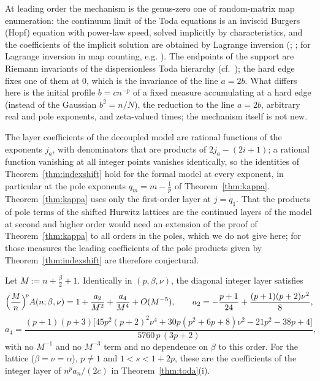 At leading order the mechanism is the genus-zero one of random-matrix map enumeration: the continuum limit of the Toda equations is an
inviscid Burgers (Hopf) equation with power-law speed, solved implicitly by characteristics, and the coefficients of the implicit
solution are obtained by Lagrange inversion (\cite[Section~2.3]{Ercolani}; \cite{EMP}; for Lagrange inversion in map counting, e.g.
\cite[Section~26.4]{Bouttier}). The endpoints of the support are Riemann invariants of the dispersionless Toda hierarchy
(cf.~\cite{KonopelchenkoMAM}); the hard edge fixes one of them at $0$, which is the invariance of the line $a=2b$. What differs here is the
initial profile $b=cn^{-p}$ of a fixed measure accumulating at a hard edge (instead of the Gaussian $b^2=n/N$), the reduction to the
line $a=2b$, arbitrary real and pole exponents, and zeta-valued times; the mechanism itself is not new.

\begin{remark}\label{rem:indexshift-poles}
The layer coefficients of the decoupled model are rational functions of the exponents $j_a$, with denominators that are products of
$2j_a-(2i+1)$; a rational function vanishing at all integer points vanishes identically, so the identities of
Theorem~\ref{thm:indexshift} hold for the formal model at every exponent, in particular at the pole exponents $q_m=m-\frac1p$ of
Theorem~\ref{thm:kappa}. Theorem~\ref{thm:kappa} uses only the first-order layer at $j=q_1$. That the products of pole terms of the
shifted Hurwitz lattices are the continued layers of the model at second and higher order would need an extension of the proof of
Theorem~\ref{thm:kappa} to all orders in the poles, which we do not give here; for those measures the leading coefficients of the pole
products given by Theorem~\ref{thm:indexshift} are therefore conjectural.
\end{remark}

\begin{proposition}\label{prop:diag4}
Let $M:=n+\frac\beta2+1$. Identically in $(p,\beta,\nu)$, the diagonal integer layer satisfies
\[
  \Bigl(\frac Mn\Bigr)^{\!p}A(n;\beta,\nu)=1+\frac{a_2}{M^2}+\frac{a_4}{M^4}+O(M^{-5}),\qquad a_2=-\frac{p+1}{24}+\frac{(p+1)(p+2)\nu^2}8,
\]
\[
  a_4=\frac{(p+1)(p+3)\bigl[45p^2(p+2)^2\nu^4+30p(p^2+6p+8)\nu^2-21p^2-38p+4\bigr]}{5760\,p\,(3p+2)},
\]
with no $M^{-1}$ and no $M^{-3}$ term and no dependence on $\beta$ to this order. For the lattice ($\beta=\nu=\alpha$), $p\ne1$ and
$1<s<1+2p$, these are the coefficients of the integer layer of $n^pa_n/(2c)$ in Theorem~\ref{thm:toda}(i).
\end{proposition}

